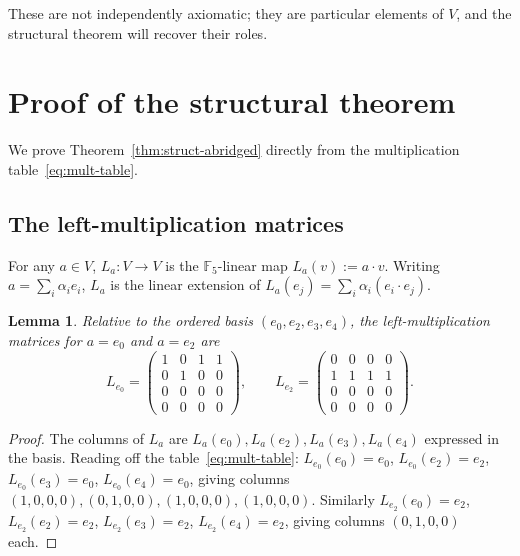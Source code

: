 \documentclass[11pt,reqno]{amsart}
\theoremstyle{plain}
\newtheorem{lemma}[theorem]{Lemma}
\theoremstyle{definition}
\theoremstyle{remark}
\newcommand{\F}{\mathbb{F}}
\begin{document}
These are not independently axiomatic; they are particular elements of $V$, and the structural theorem will recover their roles.

\section{Proof of the structural theorem}
\label{sec:proofs}

We prove Theorem~\ref{thm:struct-abridged} directly from the multiplication table~\eqref{eq:mult-table}.

\subsection{The left-multiplication matrices}

For any $a \in V$, $L_a \colon V \to V$ is the $\F_5$-linear map $L_a(v) := a \cdot v$. Writing $a = \sum_i \alpha_i e_i$, $L_a$ is the linear extension of $L_a(e_j) = \sum_i \alpha_i (e_i \cdot e_j)$.

\begin{lemma} \label{lem:L-matrices}
Relative to the ordered basis $(e_0, e_2, e_3, e_4)$, the left-multiplication matrices for $a = e_0$ and $a = e_2$ are
\begin{equation}\label{eq:L-e0-e2}
L_{e_0} = \begin{pmatrix}
1 & 0 & 1 & 1 \\
0 & 1 & 0 & 0 \\
0 & 0 & 0 & 0 \\
0 & 0 & 0 & 0
\end{pmatrix}, \qquad
L_{e_2} = \begin{pmatrix}
0 & 0 & 0 & 0 \\
1 & 1 & 1 & 1 \\
0 & 0 & 0 & 0 \\
0 & 0 & 0 & 0
\end{pmatrix}.
\end{equation}
\end{lemma}

\begin{proof}
The columns of $L_a$ are $L_a(e_0), L_a(e_2), L_a(e_3), L_a(e_4)$ expressed in the basis. Reading off the table~\eqref{eq:mult-table}: $L_{e_0}(e_0) = e_0$, $L_{e_0}(e_2) = e_2$, $L_{e_0}(e_3) = e_0$, $L_{e_0}(e_4) = e_0$, giving columns $(1,0,0,0), (0,1,0,0), (1,0,0,0), (1,0,0,0)$. Similarly $L_{e_2}(e_0) = e_2$, $L_{e_2}(e_2) = e_2$, $L_{e_2}(e_3) = e_2$, $L_{e_2}(e_4) = e_2$, giving columns $(0,1,0,0)$ each.
\end{proof}
\end{document}
